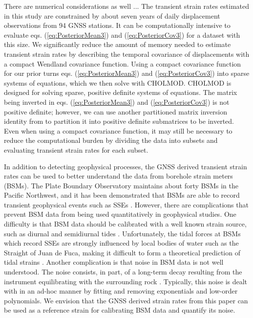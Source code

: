 \documentclass[extra,mreferee]{gji}
\begin{document}



There are numerical considerations as well ...
The transient strain rates estimated in this study are constrained by
about seven years of daily displacement observations from 94 GNSS
stations. It can be computationally intensive to evaluate eqs.
(\ref{eq:PosteriorMean3}) and (\ref{eq:PosteriorCov3}) for a dataset
with this size. We significantly reduce the amount of memory needed to
estimate transient strain rates by describing the temporal covariance
of displacements with a compact Wendland covariance function. Using a
compact covariance function for our prior turns eqs.
(\ref{eq:PosteriorMean3}) and (\ref{eq:PosteriorCov3}) into sparse
systems of equations, which we then solve with CHOLMOD. CHOLMOD is
designed for solving sparse, positive definite systems of equations.
The matrix being inverted in eqs. (\ref{eq:PosteriorMean3}) and
(\ref{eq:PosteriorCov3}) is not positive definite; however, we can use
another partitioned matrix inversion identity from \citet{Press2007}
to partition it into positive definite submatrices to be inverted.
Even when using a compact covariance function, it may still be
necessary to reduce the computational burden by dividing the data into
subsets and evaluating transient strain rates for each subset.


In addition to detecting geophysical processes, the GNSS derived
transient strain rates can be used to better understand the data from
borehole strain meters (BSMs). The Plate Boundary Observatory
maintains about forty BSMs in the Pacific Northwest, and it has been
demonstrated that BSMs are able to record transient geophysical events
such as SSEs \citep[e.g.,][]{Dragert2011}. However, there are
complications that prevent BSM data from being used quantitatively in
geophysical studies. One difficulty is that BSM data should be
calibrated with a well known strain source, such as diurnal and
semidiurnal tides \citep{Hart1996,Roeloffs2010,Hodgkinson2013}.
Unfortunately, the tidal forces at BSMs which record SSEs are strongly
influenced by local bodies of water such as the Straight of Juan de
Fuca, making it difficult to form a theoretical prediction of tidal
strains \citep{Roeloffs2010}. Another complication is that noise in
BSM data is not well understood. The noise consists, in part, of a
long-term decay resulting from the instrument equilibrating with the
surrounding rock \citep{Gladwin1987}. Typically, this noise is dealt
with in an ad-hoc manner by fitting and removing exponentials and
low-order polynomials. We envision that the GNSS derived strain rates
from this paper can be used as a reference strain for calibrating BSM
data and quantify its noise.
\end{document}
